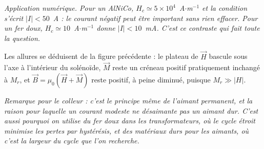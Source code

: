 \begin{correction}
\begin{enumerate}
	\textit{Application numérique. Pour un AlNiCo, $H_c\simeq5\times10^{4}$~A$\cdot$m$^{-1}$ et la condition s'écrit $|I|<50$~A : le courant négatif peut être important sans rien effacer. Pour un fer doux, $H_c\simeq10$~A$\cdot$m$^{-1}$ donne $|I|<10$~mA. C'est ce contraste qui fait toute la question.}

	Les allures se déduisent de la figure précédente : le plateau de $\vec{H}$ bascule sous l'axe à l'intérieur du solénoïde, $\vec{M}$ reste un créneau positif pratiquement inchangé à $M_r$, et $\vec{B}=\mu_0(\vec{H}+\vec{M})$ reste positif, à peine diminué, puisque $M_r\gg|H|$.

	\textit{Remarque pour le colleur : c'est le principe même de l'aimant permanent, et la raison pour laquelle un courant modeste ne désaimante pas un aimant dur. C'est aussi pourquoi on utilise du fer doux dans les transformateurs, où le cycle étroit minimise les pertes par hystérésis, et des matériaux durs pour les aimants, où c'est la largeur du cycle que l'on recherche.}

\end{enumerate}

\end{correction}
